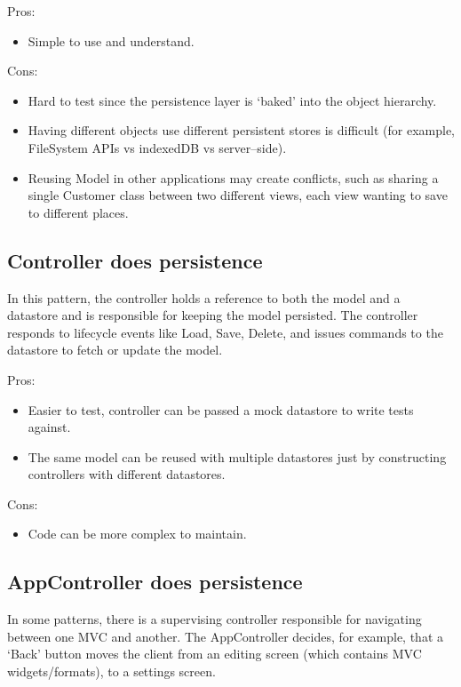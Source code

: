 Pros:
\begin{itemize}
  \item Simple to use and understand.
\end{itemize}

Cons:
\begin{itemize}
  \item Hard to test since the persistence layer is `baked' into the object hierarchy.
  \item Having different objects use different persistent stores is difficult (for example, FileSystem APIs vs indexedDB vs server–side).
  \item Reusing Model in other applications may create conflicts, such as sharing a single Customer class between two different views, each view wanting to save to different places.
\end{itemize}


\subsection{Controller does persistence}
In this pattern, the controller holds a reference to both the model and a datastore and is responsible for keeping the model persisted. The controller responds to lifecycle events like Load, Save, Delete, and issues commands to the datastore to fetch or update the model.

Pros:
\begin{itemize}
  \item Easier to test, controller can be passed a mock datastore to write tests against.
  \item The same model can be reused with multiple datastores just by constructing controllers with different datastores.
\end{itemize}

Cons:
\begin{itemize}
  \item Code can be more complex to maintain.
\end{itemize}


\subsection{AppController does persistence}
In some patterns, there is a supervising controller responsible for navigating between one MVC and another. The AppController decides, for example, that a `Back' button moves the client from an editing screen (which contains MVC widgets/formats), to a settings screen.

